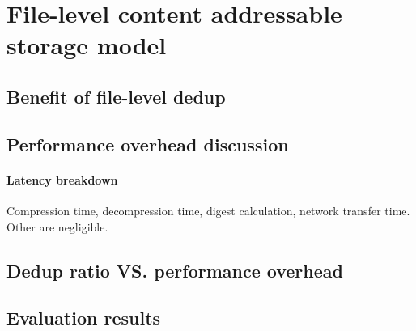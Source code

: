 \section{File-level content addressable storage model}
\label{sec:file_adressable}


\subsection{Benefit of file-level dedup}



\subsection{Performance overhead discussion}

\paragraph{Latency breakdown} Compression time, decompression time, digest calculation, network transfer time. Other are negligible. 



\subsection{Dedup ratio VS. performance overhead}



\subsection{Evaluation results}